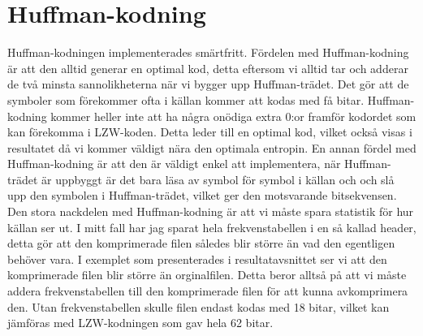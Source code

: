 \section{Huffman-kodning}
Huffman-kodningen implementerades smärtfritt. Fördelen med Huffman-kodning är att den alltid generar en optimal kod, detta eftersom vi alltid tar och adderar de två minsta sannolikheterna när vi bygger upp Huffman-trädet. Det gör att de symboler som förekommer ofta i källan kommer att kodas med få bitar. Huffman-kodning kommer heller inte att ha några onödiga extra 0:or framför kodordet som kan förekomma i LZW-koden. Detta leder till en optimal kod, vilket också visas i resultatet då vi kommer väldigt nära den optimala entropin. En annan fördel med Huffman-kodning är att den är väldigt enkel att implementera, när Huffman-trädet är uppbyggt är det bara läsa av symbol för symbol i källan och och slå upp den symbolen i Huffman-trädet, vilket ger den motsvarande bitsekvensen.
Den stora nackdelen med Huffman-kodning är att vi måste spara statistik för hur källan ser ut. I mitt fall har jag sparat hela frekvenstabellen i en så kallad header, detta gör att den komprimerade filen således blir större än vad den egentligen behöver vara. I exemplet som presenterades i resultatavsnittet ser vi att den komprimerade filen blir större än orginalfilen. Detta beror alltså på att vi måste addera frekvenstabellen till den komprimerade filen för att kunna avkomprimera den. Utan frekvenstabellen skulle filen endast kodas med 18 bitar, vilket kan jämföras med LZW-kodningen som gav hela 62 bitar.

